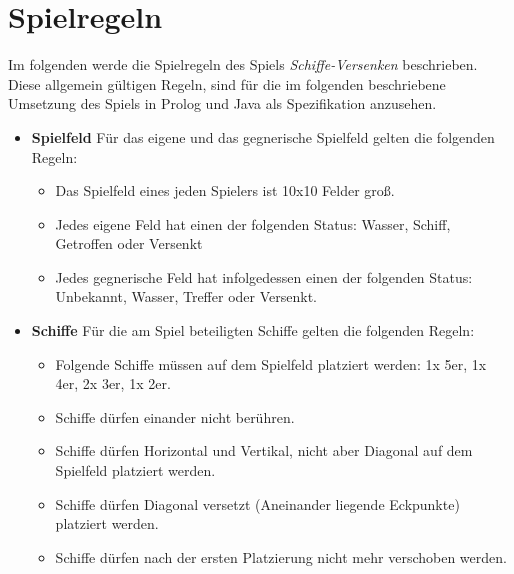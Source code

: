 \section{Spielregeln}
\label{sec:Spielregeln}

Im folgenden werde die Spielregeln des Spiels \emph{Schiffe-Versenken} beschrieben. Diese allgemein gültigen Regeln, sind für 
die im folgenden beschriebene Umsetzung des Spiels in Prolog und Java als Spezifikation anzusehen.



\begin{itemize}
	\item \textbf{Spielfeld} \newline Für das eigene und das gegnerische Spielfeld gelten die folgenden Regeln:
		\begin{itemize}
			\item Das Spielfeld eines jeden Spielers ist 10x10 Felder groß.
			\item Jedes eigene Feld hat einen der folgenden Status: Wasser, Schiff, Getroffen oder Versenkt
			\item Jedes gegnerische Feld hat infolgedessen einen der folgenden Status: Unbekannt, Wasser, Treffer oder Versenkt.
		\end{itemize}
	\item \textbf{Schiffe} \newline Für die am Spiel beteiligten Schiffe gelten die folgenden Regeln:
		\begin{itemize}
			\item Folgende Schiffe müssen auf dem Spielfeld platziert werden: 1x 5er, 1x 4er, 2x 3er, 1x 2er.
			\item Schiffe dürfen einander nicht berühren.
			\item Schiffe dürfen Horizontal und Vertikal, nicht aber Diagonal auf dem Spielfeld platziert werden. %
			\item Schiffe dürfen Diagonal versetzt (Aneinander liegende Eckpunkte) platziert werden.
			\item Schiffe dürfen nach der ersten Platzierung nicht mehr verschoben werden.
		\end{itemize}

\end{itemize}
